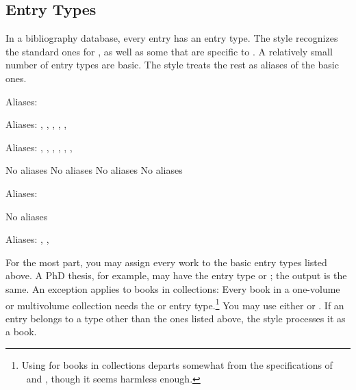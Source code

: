 \documentclass[11pt,letterpaper,oneside]{article}
\begin{document}
\subsection{Entry Types}
\label{entrytypes}

In a bibliography database, every entry has an entry type. The style
recognizes the standard ones for \BibTeX, as well as some that are
specific to \biblatex. A relatively small number of entry types are
basic. The style treats the rest as aliases of the basic ones.

\begin{typelist}
\RaggedRight


Aliases: 


Aliases: , , ,
, , 


Aliases: , ,
, , ,
, 

 No aliases
 No aliases
 No aliases
 No aliases


Aliases: 

 No aliases


Aliases: , ,

\end{typelist}

\noindent For the most part, you may assign every work to the basic
entry types listed above. A PhD thesis, for example, may have the
entry type  or ; the output is the
same. An exception applies to books in collections: Every book in a
one-volume or multivolume collection needs the  or
 entry type.\footnote{Using  for
books in collections departs somewhat from the specifications of
\BibTeX\ and \biblatex, though it seems harmless enough.} You may use
either  or . If an entry belongs
to a type other than the ones listed above, the style processes it as
a book.
\end{document}
